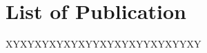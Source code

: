 \documentclass[12pt]{article}
\begin{document}
\section{List of Publication}

\vspace{10pt}

  \noindent XYXYXYXYXYXYYXYXYXYYXYXYYXY
\end{document}
